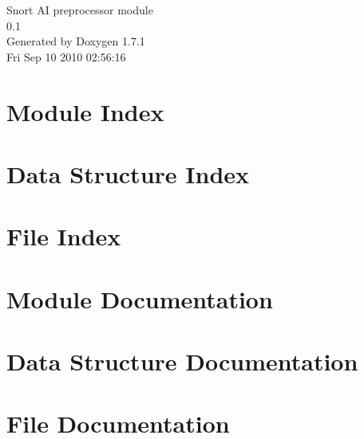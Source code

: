 \documentclass[a4paper]{book}
\begin{document}
\hypersetup{pageanchor=false}
\begin{titlepage}
\vspace*{7cm}
\begin{center}
{\Large Snort AI preprocessor module \\[1ex]\large 0.1 }\\
\vspace*{1cm}
{\large Generated by Doxygen 1.7.1}\\
\vspace*{0.5cm}
{\small Fri Sep 10 2010 02:56:16}\\
\end{center}
\end{titlepage}
\clearemptydoublepage
{}
\tableofcontents
\clearemptydoublepage
{}
\hypersetup{pageanchor=true}
\chapter{Module Index}

\chapter{Data Structure Index}

\chapter{File Index}

\chapter{Module Documentation}






\chapter{Data Structure Documentation}









\chapter{File Documentation}











\printindex
\end{document}
